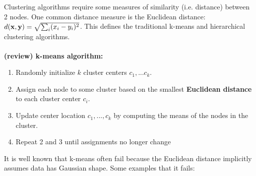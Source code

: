 \documentclass[./some_latex_template.tex]{subfiles}
\begin{document}
Clustering algorithms require some measures of similarity (i.e. distance) between 2 nodes. One common distance measure is the Euclidean distance: $d(\mathbf{x}, \mathbf{y}) = \sqrt{\sum_{i}(x_i - y_i)^2}$. This defines the traditional k-means and hierarchical clustering algorithms.\\
\\
\textbf{(review) k-means algorithm:}
\begin{enumerate}
	\item Randomly initialize $k$ cluster centers $c_1,...c_k$. 
	\item Assign each node to some cluster based on the smallest \textbf{Euclidean distance} to each cluster center $c_i$.
	\item Update center location $c_1, ..., c_k$ by computing the means of the nodes in the cluster. 
	\item Repeat 2 and 3 until assignments no longer change
\end{enumerate}

It is well known that k-means often fail because the Euclidean distance implicitly assumes data has Gaussian shape. Some examples that it fails:
\end{document}
